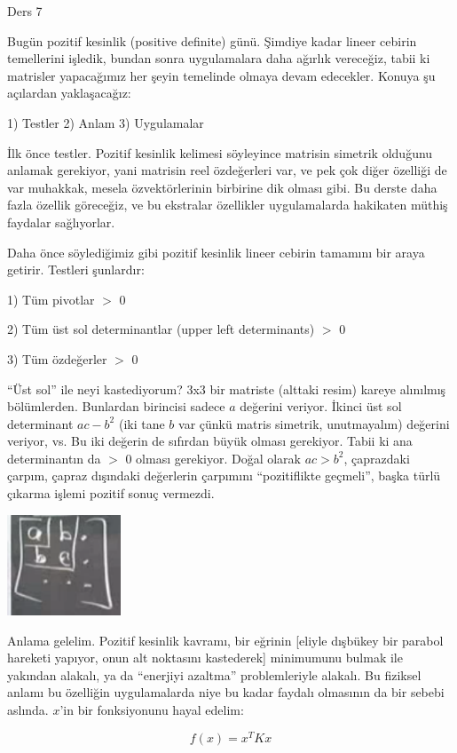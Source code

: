 \documentclass[12pt,fleqn]{article}\usepackage{../../common}
\begin{document}
Ders 7

Bugün pozitif kesinlik (positive definite) günü. Şimdiye kadar lineer
cebirin temellerini işledik, bundan sonra uygulamalara daha ağırlık
vereceğiz, tabii ki matrisler yapacağımız her şeyin temelinde olmaya devam
edecekler. Konuya şu açılardan yaklaşacağız:

1) Testler 2) Anlam 3) Uygulamalar

İlk önce testler. Pozitif kesinlik kelimesi söyleyince matrisin simetrik
olduğunu anlamak gerekiyor, yani matrisin reel özdeğerleri var, ve pek çok
diğer özelliği de var muhakkak, mesela özvektörlerinin birbirine dik olması
gibi. Bu derste daha fazla özellik göreceğiz, ve bu ekstralar özellikler
uygulamalarda hakikaten müthiş faydalar sağlıyorlar.

Daha önce söylediğimiz gibi pozitif kesinlik lineer cebirin tamamını bir
araya getirir. Testleri şunlardır:

1) Tüm pivotlar $>$ 0 

2) Tüm üst sol determinantlar (upper left determinants)  $>$ 0

3) Tüm özdeğerler $>$ 0

``Üst sol'' ile neyi kastediyorum? 3x3 bir matriste (alttaki resim) kareye
alınılmış bölümlerden. Bunlardan birincisi sadece $a$ değerini
veriyor. İkinci üst sol determinant $ac - b^2$ (iki tane $b$ var çünkü
matris simetrik, unutmayalım) değerini veriyor, vs. Bu iki değerin de
sıfırdan büyük olması gerekiyor. Tabii ki ana determinantın da $>$ 0 olması
gerekiyor. Doğal olarak $ac > b^2$, çaprazdaki çarpım, çapraz dışındaki
değerlerin çarpımını ``pozitiflikte geçmeli'', başka türlü çıkarma işlemi
pozitif sonuç vermezdi.

\includegraphics[height=3cm]{7_1.png}

Anlama gelelim. Pozitif kesinlik kavramı, bir eğrinin [eliyle dışbükey bir
parabol hareketi yapıyor, onun alt noktasını kastederek] minimumunu bulmak
ile yakından alakalı, ya da ``enerjiyi azaltma'' problemleriyle alakalı. Bu
fiziksel anlamı bu özelliğin uygulamalarda niye bu kadar faydalı olmasının
da bir sebebi aslında. $x$'in bir fonksiyonunu hayal edelim:

$$ f(x) = x^TKx $$
\end{document}
